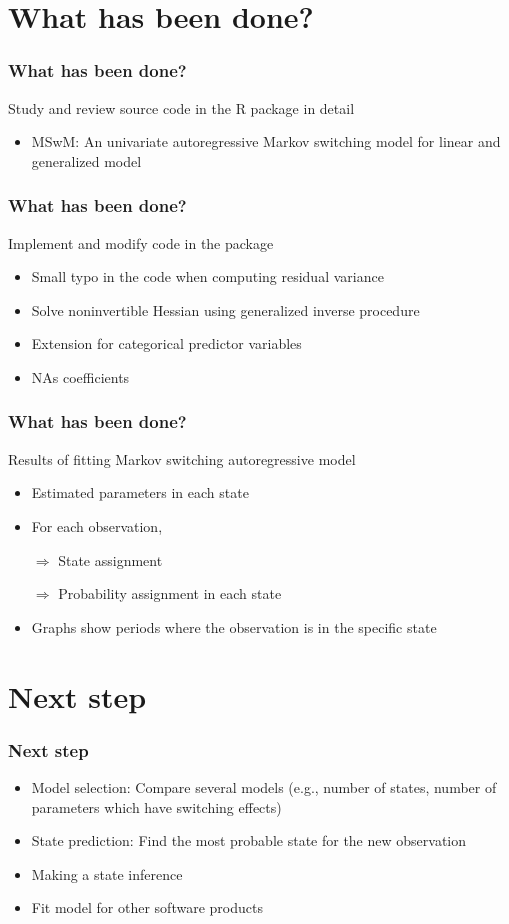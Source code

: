 \documentclass{beamer}
\begin{document}
\section{What has been done?}
\begin{frame}
\frametitle{What has been done?}
Study and review source code  in the R package in detail
\begin{itemize}
	\item MSwM: An univariate autoregressive Markov switching model for linear and generalized model \cite{p3}
\end{itemize}
\end{frame}

\begin{frame}
\frametitle{What has been done?}
Implement and modify code in the package
\begin{itemize}
	\item Small typo in the code when computing residual variance
	\item Solve noninvertible Hessian using generalized inverse procedure \cite{p2}
	\item Extension for categorical predictor variables
	\item NAs coefficients
\end{itemize}
\end{frame}

\begin{frame}
\frametitle{What has been done?}
Results of fitting Markov switching autoregressive model
\begin{itemize}
	\item Estimated parameters in each state
	\item For each observation,
	
	$\Rightarrow$ State assignment
	
	$\Rightarrow$ Probability assignment in each state
	
	\item Graphs show periods where the observation is in the specific state
\end{itemize}

\end{frame}

\section{Next step}
\begin{frame}
\frametitle{Next step}
\begin{itemize}
	\item Model selection: Compare several models (e.g., number of states, number of parameters which have switching effects)
	\item State prediction: Find the most probable state for the new observation
	\item Making a state inference
	\item Fit model for other software products

\end{itemize}
\end{frame}
\end{document}
